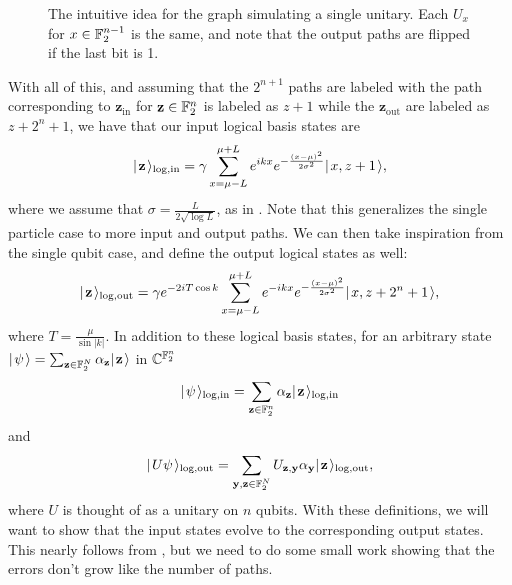 \documentclass[../thesis-main/thesis-main]{subfiles}
\begin{document}
\begin{figure}
  \centering
  
      \caption[Quantum walk multi-qubit unitary]{The intuitive idea for the graph simulating a single unitary.  Each $U_{x}$ for $x\in \mathbb{F}_2^{n-1}$ is the same, and note that the output paths are flipped if the last bit is 1.}
  \label{fig:SP_block}
\end{figure}

With all of this, and assuming that the $2^{n+1}$ paths are labeled with the path corresponding to $\mathbf{z}_{\text{in}}$ for $\mathbf{z}\in \mathbb{F}_2^n$ is labeled as $z+1$ while the $\mathbf{z}_{\text{out}}$ are labeled as $z+2^n+1$, we have that our input logical basis states are
\begin{align}
  |\mspace{2mu} \mathbf{z} \mspace{2mu} \rangle_{\text{log},\text{in}} = \gamma \sum_{x = \mu - L}^{\mu + L} e^{ i k x} e^{ - \frac{(x-\mu)^2}{2\sigma^2}} |\mspace{2mu} x,z+1 \mspace{2mu} \rangle,
  \label{eq:multi_qubit_input_encoding}
\end{align}
where we assume that $\sigma = \frac{L}{2\sqrt{\log L}}$, as in .  Note that this generalizes the single particle case  to more input and output paths.  We can then take inspiration from the single qubit case, and define the output logical states as well:
 \begin{align}
  |\mspace{2mu} \mathbf{z} \mspace{2mu} \rangle_{\text{log},\text{out}} = \gamma e^{- 2 i T \cos k} \sum_{x = \mu - L}^{\mu + L} e^{ -i k x} e^{ - \frac{(x-\mu)^2}{2\sigma^2}} |\mspace{2mu} x,z+2^n + 1 \mspace{2mu} \rangle,
  \label{eq:multi_qubit_output_encoding}
\end{align}
where $T = \frac{\mu}{\sin |k|}$.  In addition to these logical basis states, for an arbitrary state $|\mspace{2mu} \psi \mspace{2mu} \rangle = \sum_{\mathbf{z}\in \mathbb{F}_2^N} \alpha_{\mathbf{z}} |\mspace{2mu} \mathbf{z} \mspace{2mu} \rangle$ in $\mathbb{C}^{\mathbb{F}_2^n}$
\begin{align}
  |\mspace{2mu} \psi \mspace{2mu} \rangle_{\text{log},\text{in}} = \sum_{\mathbf{z}\in \mathbb{F}_2^n} \alpha_{\mathbf{z}} |\mspace{2mu} \mathbf{z} \mspace{2mu} \rangle_{\text{log},\text{in}}
\end{align} 
and
\begin{align}
  |\mspace{2mu} U \psi \mspace{2mu} \rangle_{\text{log},\text{out}} = \sum_{\mathbf{y},\mathbf{z}\in\mathbb{F}_2^N} U_{\mathbf{z},\mathbf{y}} \alpha_{\mathbf{y}}|\mspace{2mu} \mathbf{z} \mspace{2mu} \rangle_{\text{log},\text{out}},
\end{align}
where $U$ is thought of as a unitary on $n$ qubits.  With these definitions, we will want to show that the input states evolve to the corresponding output states.  This nearly follows from , but we need to do some small work showing that the errors don't grow like the number of paths.
\end{document}
